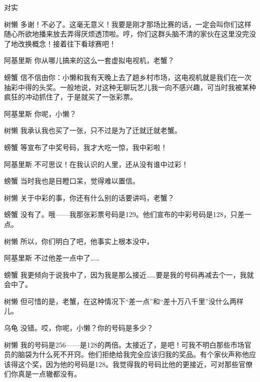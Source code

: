\begin{dialog}{对实}
\begin{dialogue}
\item[树懒]多谢！不必了。这毫无意义！我要是刚才那场比赛的话，一定会叫你们这样随心所欲地播来放去弄得厌烦透顶啦。哼，你们这群头脑不清的家伙在这里没完没了地改换概念！接着往下看球赛吧！

\item[阿基里斯]你从哪儿搞来的这么一套虚拟电视机，老蟹？

\item[螃蟹]信不信由你：小懒和我有天晚上去了趟乡村市场，这电视机就是我们在一次抽彩中得的头奖。一般地说，对这种无聊玩艺儿我一向不感兴趣，可当时我被某种疯狂的冲动抓住了，于是就买了一张彩票。

\item[阿基里斯]你呢，小懒？

\item[树懒]我承认我也买了一张，只不过是为了迁就迁就老蟹。

\item[螃蟹]等宣布了中奖号码，我才大吃一惊，我中彩啦！

\item[阿基里斯]不可思议！在我认识的人里，还从没有谁中过彩！

\item[螃蟹]当时我也是目瞪口呆，觉得难以置信。

\item[树懒]关于中彩的事，你还有什么别的话要讲吗，老蟹？

\item[螃蟹]没有了。哦——我那张彩票号码是129。他们宣布的中彩号码是128，只差一点。

\item[树懒]所以，你们明白了吧，他事实上根本没中，

\item[阿基里斯]不过他差一点中了……

\item[螃蟹]我更倾向于说我中了，因为我是那么接近……要是我的号码再减去个一，我就会中了。

\item[树懒]但可惜的是，老蟹，在这种情况下“差一点”和“差十万八千里”没什么两样儿。

\item[乌龟]没错。哎，你呢，小懒？你的号码是多少？

\item[树懒]我的号码是256——是128的两倍。太接近了，是吧！可我不明白那些市场官员的脑袋为什么死不开窍。他们拒绝给我完全应该归我的奖品。有个家伙声称他应该得这个奖，因为他的号码是128。我觉得我的号码比他的更接近，可对那些官僚们你真是一点辙都没有。


\end{dialogue}
\end{dialog}
